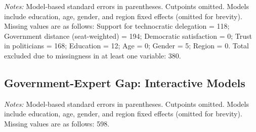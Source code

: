 \documentclass[11pt]{article}\usepackage[]{graphicx}\usepackage[]{xcolor}
\begin{document}
\begin{table}[!htbp]
\centering
\caption{Ordered logit (proportional odds) estimates: Government Distance}
\label{tab:ologit-models}
\setlength{\tabcolsep}{3.5pt} %
\resizebox{\textwidth}{!}{}
\par\vspace{0.4ex}
\footnotesize\emph{Notes:} Model-based standard errors in parentheses. Cutpoints omitted. Models include education, age, gender, and region fixed effects (omitted for brevity). Missing values are as follows: Support for technocratic delegation = 118; Government distance (seat-weighted) = 194; Democratic satisfaction = 0; Trust in politicians = 168; Education = 12; Age = 0; Gender = 5; Region = 0. Total excluded due to missingness in at least one variable: 380.
\end{table}

\newpage
\subsection{Government-Expert Gap: Interactive Models}
\FloatBarrier


\begin{table}[!htbp]
\centering
\caption{Interactive OLS models: Technocracy $\times$ Government distance moderated by Gov-Expert trust gap}
\label{tab:interact-models}
\resizebox{\textwidth}{!}{}
\footnotesize\emph{Notes:} Model-based standard errors in parentheses. Cutpoints omitted. Models include education, age, gender, and region fixed effects (omitted for brevity). Missing values are as follows: 598.
\end{table}
\end{document}
